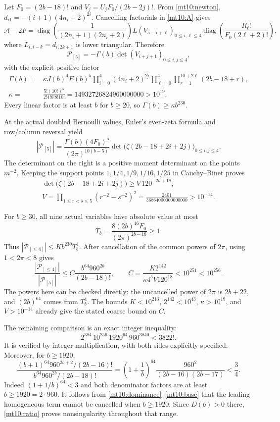 \documentclass[11pt,a4paper]{article}
\numberwithin{equation}{section}
\theoremstyle{definition}
\theoremstyle{remark}
\begin{document}
Let $F_0=(2b-18)!$ and $V_j=U_jF_0/(2b-2j)!$. From
\eqref{mt10:newton},
$d_{i1}=-(i+1)(4n_i+2)^{\underline{2i}}$. Cancelling factorials
in \eqref{mt10:A} gives
\[
 \mathcal A-2F=
 \operatorname{diag}\left(\frac1{(2n_i+1)(2n_i+2)}\right)
 L(V_{5-i+\ell})_{0\le i,\ell\le4}
 \operatorname{diag}\left(\frac{R_\ell!}{F_0(2\ell+2)!}\right),
\]
where $L_{i,i-k}=d_{i,2k+1}$ is lower triangular. Therefore
\[
 \mathscr P_{[5]}=-\Gamma(b)\det(V_{i+j+1})_{0\le i,j\le4},
\]
with the explicit positive factor
\begin{align*}
 \Gamma(b)={}&\kappa J(b)^4E(b)^5
 \prod_{i=0}^4(4n_i+2)^{\underline{2i}}
 \prod_{\ell=0}^4\prod_{r=1}^{10+2\ell}(2b-18+r),\\
 \kappa={}&\frac{5!(10!)^5}{2!4!6!8!10!}
          =14932726824960000000>10^{19}.
\end{align*}
Every linear factor is at least $b$ for $b\ge20$, so
$\Gamma(b)\ge\kappa b^{230}$.

At the actual doubled Bernoulli values, Euler's even-zeta formula
and row/column reversal yield
\[
 |\mathscr P_{[5]}|
 =\frac{\Gamma(b)(4F_0)^5}{(2\pi)^{10(b-5)}}
       \det\bigl(\zeta(2b-18+2i+2j)\bigr)_{0\le i,j\le4}.
\]
The determinant on the right is a positive moment determinant on
the points $m^{-2}$. Keeping the support points $1,1/4,1/9,1/16,1/25$
in Cauchy--Binet proves
\begin{gather*}
 \det\bigl(\zeta(2b-18+2i+2j)\bigr)\ge V\,120^{-2b+18},\\
 V=\prod_{1\le r<s\le5}(r^{-2}-s^{-2})^2
        =\frac{2401}{36864000000000000}>10^{-14}.
\end{gather*}

For $b\ge30$, all nine actual variables have absolute value at most
\[
       T_b=\frac{8(2b)^{16}F_0}{(2\pi)^{2b-18}}\ge1.
\]
Thus $|\mathscr P_{[\le4]}|\le Kb^{230}T_b^4$.
After cancellation of the common powers of $2\pi$, using
$1<2\pi<8$ gives
\begin{equation}\label{mt10:dominance}
 \frac{|\mathscr P_{[\le4]}|}{|\mathscr P_{[5]}|}
 \le C\frac{b^{64}960^{2b}}{(2b-18)!},\qquad
 C=\frac{K2^{142}}{\kappa4^5V120^{18}}<10^{251}<10^{256}.
\end{equation}
The powers here can be checked directly: the uncancelled power of
$2\pi$ is $2b+22$, and $(2b)^{64}$ comes from $T_b^4$.
The bounds $K<10^{213}$, $2^{142}<10^{43}$, $\kappa>10^{19}$,
and $V>10^{-14}$ already give the stated coarse bound on $C$.

The remaining comparison is an exact integer inequality:
\begin{equation}\label{mt10:base}
       2^{384}\,10^{256}\,1920^{64}\,960^{3840}<3822!.
\end{equation}
It is verified by integer multiplication, with both sides explicitly
specified. Moreover, for $b\ge1920$,
\[
 \frac{(b+1)^{64}960^{2b+2}/(2b-16)!}
      {b^{64}960^{2b}/(2b-18)!}
 =\left(1+\frac1b\right)^{64}
            \frac{960^2}{(2b-16)(2b-17)}<\frac34.
\]
Indeed $(1+1/b)^{64}<3$ and both denominator factors are at least
$b\ge1920=2\cdot960$. It follows from
\eqref{mt10:dominance}--\eqref{mt10:base} that the leading homogeneous
term cannot be cancelled when $b\ge1920$. Since $D(b)>0$ there,
\eqref{mt10:ratio} proves nonsingularity throughout that range.
\end{document}
